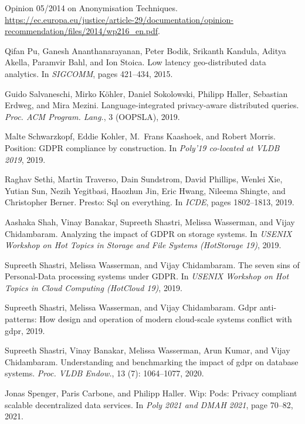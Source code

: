 \documentclass[11pt]{article}
\begin{document}
\begin{thebibliography}{10}
\begin{small}
Opinion 05/2014 on Anonymisation Techniques.
\newblock
  \url{https://ec.europa.eu/justice/article-29/documentation/opinion-recommendation/files/2014/wp216\_en.pdf}.

Qifan Pu, Ganesh Ananthanarayanan, Peter Bodik, Srikanth Kandula, Aditya
  Akella, Paramvir Bahl, and Ion Stoica.
\newblock Low latency geo-distributed data analytics.
\newblock In \emph{SIGCOMM}, pages 421--434, 2015.

Guido Salvaneschi, Mirko K\"{o}hler, Daniel Sokolowski, Philipp Haller,
  Sebastian Erdweg, and Mira Mezini.
\newblock Language-integrated privacy-aware distributed queries.
\newblock \emph{Proc. ACM Program. Lang.}, 3 (OOPSLA), 2019.

Malte Schwarzkopf, Eddie Kohler, M.~Frans Kaashoek, and Robert Morris.
\newblock Position: {GDPR} compliance by construction.
\newblock In \emph{Poly'19 co-located at VLDB 2019}, 2019.

Raghav Sethi, Martin Traverso, Dain Sundstrom, David Phillips, Wenlei Xie,
  Yutian Sun, Nezih Yegitbasi, Haozhun Jin, Eric Hwang, Nileema Shingte, and
  Christopher Berner.
\newblock Presto: Sql on everything.
\newblock In \emph{ICDE}, pages 1802--1813, 2019.

Aashaka Shah, Vinay Banakar, Supreeth Shastri, Melissa Wasserman, and Vijay
  Chidambaram.
\newblock Analyzing the impact of {GDPR} on storage systems.
\newblock In \emph{USENIX Workshop on Hot Topics in Storage and File Systems
  (HotStorage 19)}, 2019.

Supreeth Shastri, Melissa Wasserman, and Vijay Chidambaram.
\newblock The seven sins of {Personal-Data} processing systems under {GDPR}.
\newblock In \emph{USENIX Workshop on Hot Topics in Cloud Computing (HotCloud
  19)}, 2019.

Supreeth Shastri, Melissa Wasserman, and Vijay Chidambaram.
\newblock Gdpr anti-patterns: How design and operation of modern cloud-scale
  systems conflict with gdpr, 2019.

Supreeth Shastri, Vinay Banakar, Melissa Wasserman, Arun Kumar, and Vijay
  Chidambaram.
\newblock Understanding and benchmarking the impact of gdpr on database
  systems.
\newblock \emph{Proc. VLDB Endow.}, 13 (7): 1064–1077,
  2020.

Jonas Spenger, Paris Carbone, and Philipp Haller.
\newblock Wip: Pods: Privacy compliant scalable decentralized data services.
\newblock In \emph{Poly 2021 and DMAH 2021}, page 70–82, 2021.


\end{small}
\end{thebibliography}
\end{document}
